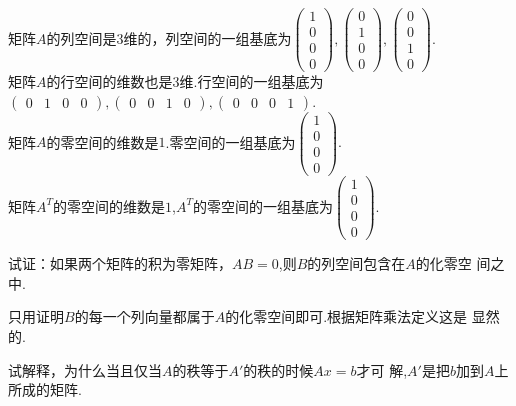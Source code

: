 ﻿\documentclass{book} \usepackage{exsheets} \usepackage{xeCJK}
\begin{document}
\begin{solution}
  矩阵$A$的列空间是$3$维的，列空间的一组基底为$
  \begin{pmatrix}
    1\\
    0\\
    0\\
    0
  \end{pmatrix},
  \begin{pmatrix}
    0\\
    1\\
    0\\
    0
  \end{pmatrix},
  \begin{pmatrix}
    0\\
    0\\
    1\\
    0
  \end{pmatrix}.
  $\\
  矩阵$A$的行空间的维数也是$3$维.行空间的一组基底为$
  \begin{pmatrix}
    0&1&0&0
  \end{pmatrix},
  \begin{pmatrix}
    0&0&1&0
  \end{pmatrix},
  \begin{pmatrix}
    0&0&0&1
  \end{pmatrix}.
  $\\
  矩阵$A$的零空间的维数是$1$.零空间的一组基底为$
  \begin{pmatrix}
    1\\
    0\\
    0\\
    0
  \end{pmatrix}.
  $\\
  矩阵$A^T$的零空间的维数是$1$,$A^T$的零空间的一组基底为$
  \begin{pmatrix}
    1\\
    0\\
    0\\
    0
  \end{pmatrix}.  $
\end{solution}
\begin{question}
  试证：如果两个矩阵的积为零矩阵，$AB=0$,则$B$的列空间包含在$A$的化零空
  间之中.
\end{question}
\begin{solution}
  只用证明$B$的每一个列向量都属于$A$的化零空间即可.根据矩阵乘法定义这是
  显然的.
\end{solution}
\begin{question}
  试解释，为什么当且仅当$A$的秩等于$A'$的秩的时候$Ax=b$才可
  解,$A'$是把$b$加到$A$上所成的矩阵.
\end{question}
\end{document}
